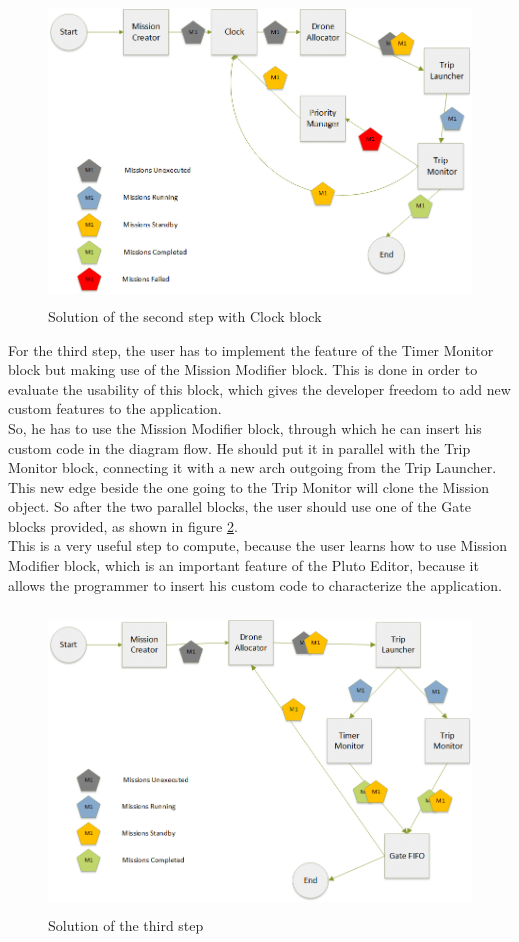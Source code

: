 \begin{figure}[htb]
  \centering
  \includegraphics[width=\linewidth,height=8cm]{pictures/secondStepClock.png}
  \caption{Solution of the second step with Clock block}
  \label{fig:secondStepClock}
\end{figure}

For the third step, the user has to implement the feature of the Timer Monitor block but making use of the Mission Modifier block. This is done in order to evaluate the usability of this block, which gives the developer freedom to add new custom features to the application.
\\
So, he has to use the Mission Modifier block, through which he can insert his custom code in the diagram flow. He should put it in parallel with the Trip Monitor block, connecting it with a new arch outgoing from the Trip Launcher. This new edge beside the one going to the Trip Monitor will clone the Mission object. So after the two parallel blocks, the user should use one of the Gate blocks provided, as shown in figure \ref{fig:thirdStep}.
\\

This is a very useful step to compute, because the user learns how to use Mission Modifier block, which is an important feature of the Pluto Editor, because it allows the programmer to insert his custom code to characterize the application.
\\

\begin{figure}[htb]
  \centering
  \includegraphics[width=\linewidth, height=8cm]{pictures/thirdStep.png}
  \caption{Solution of the third step}
  \label{fig:thirdStep}
\end{figure}

